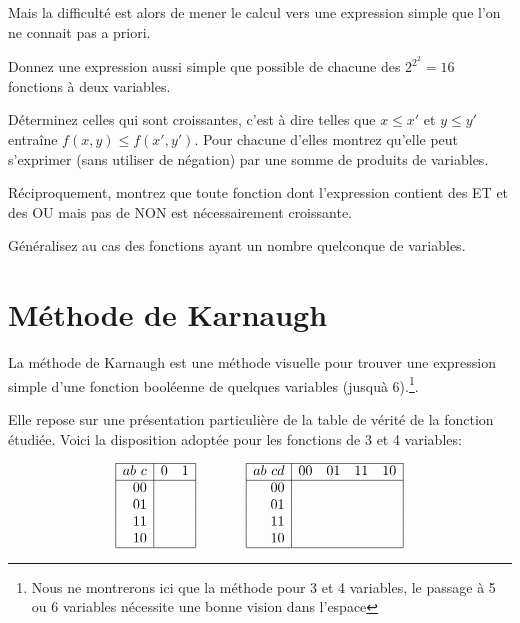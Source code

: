 Mais la difficult\'e est alors de mener le calcul vers une expression
simple que l'on ne connait pas a priori.


\begin{probleme}{} Donnez une expression aussi simple que possible de chacune des
$2^{2^2}=16$ fonctions \`a deux variables.

D\'eterminez celles qui sont croissantes, c'est à dire telles que $x \leq x'$ et $y \leq y'$ entra\^ine $f(x,y) \leq f(x',y')$.  Pour chacune d'elles montrez qu'elle peut s'exprimer (sans utiliser de n\'egation) 
par une somme de produits de variables.

R\'eciproquement, montrez que toute fonction dont l'expression contient
des ET et des OU mais pas de NON est n\'ecessairement croissante. 

G\'en\'eralisez au cas des fonctions ayant un nombre quelconque de variables. 
\end{probleme}

\section{M\'ethode de Karnaugh}

La m\'ethode de Karnaugh est une m\'ethode visuelle pour 
trouver une expression simple d'une fonction bool\'eenne de
quelques variables (jusqu\`a  6).\footnote{Nous ne montrerons ici
que la méthode pour 3 et 4 variables, le passage à 5 ou 6 variables
nécessite une bonne vision dans l'espace}.

Elle repose sur une pr\'esentation particuli\`ere de la table de v\'erit\'e de
la fonction \'etudi\'ee.  Voici la disposition adopt\'ee pour les fonctions 
de 3 et 4 variables: 

$$ \begin{array}{|r|cc|}
\cline{1-3}
ab\ c&  0 & 1 \\
\cline{1-3}
00 & & \\
01 & & \\
11 & & \\
10 & & \\
\cline{1-3}
\end{array}
\hspace{.5in}
\begin{array}{|r|cccc|}
\cline{1-5}
ab\ cd&  00 & 01 & 11 & 10 \\
\cline{1-5}
00 & & &&\\
01 & & &&\\
11 & & &&\\
10 & & &&\\
\cline{1-5}
\end{array}
$$

